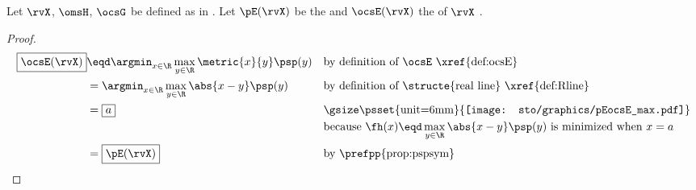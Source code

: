 \begin{theorem}
\label{thm:pEocsE}
Let $\rvX$, $\omsH$, $\ocsG$ be defined as in .
Let $\pE(\rvX)$ be the  
and $\ocsE(\rvX)$ the  of $\rvX$ .
\end{theorem}
\begin{proof}
\begin{align*}
  \boxed{\ocsE(\rvX)}
    &\eqd \argmin_{x\in\R}\max_{y\in\R}\metric{x}{y}\psp(y)
    && \text{by definition of $\ocsE$ \xref{def:ocsE}}
  \\&= \argmin_{x\in\R}\max_{y\in\R}\abs{x-y}\psp(y)
    && \text{by definition of \structe{real line} \xref{def:Rline}}
  \\&= \boxed{a}
    && \text{\gsize\centering\psset{unit=6mm}{\texttt{[image: sto/graphics/pEocsE\_max.pdf]}}}
  \\&&&\text{because $\fh(x)\eqd\max_{y\in\R}\abs{x-y}\psp(y)$ is minimized when $x=a$}%
  \\&= \boxed{\pE(\rvX)}
    && \text{by \prefpp{prop:pspsym}}
\end{align*}
\end{proof}

